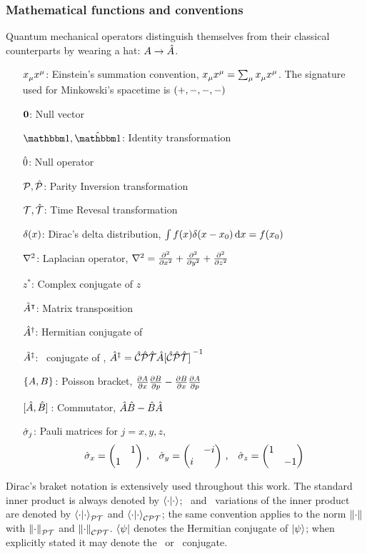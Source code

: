 \subsubsection{Mathematical functions and conventions}
Quantum mechanical operators distinguish themselves from their classical counterparts by wearing a hat: $A \to \hat{A}$.
\begin{enumerate}
    \item[$\tensor{x}{_\mu}\tensor{x}{^\mu}$:] Einstein's summation convention, $\tensor{x}{_\mu}\tensor{x}{^\mu} = \sum\nolimits_\mu \tensor{x}{_\mu}\tensor{x}{^\mu}$. The signature used for Minkowski's spacetime is $\pqty{+,-, -, -}$
    \item[$\vb{0}$:] Null vector
    \item[$\idM,\hidM$:] Identity transformation
    \item[$\hat{0}$:] Null operator 
    \item[$\mathcal{P},\mathcal{\hat{P}}$:] Parity Inversion transformation   
    \item[$\mathcal{T},\mathcal{\hat{T}}$:] Time Revesal transformation
    \item[$\delta\pqty{x}$:] Dirac's delta distribution, $\int{f\pqty{x}\delta\pqty{x-x_0}\dd{x}} = f\pqty{x_0}$
    \item[$\laplacian$:] Laplacian operator, $\laplacian = \pdv[2]{x} + \pdv[2]{y} + \pdv[2]{z}$ 
    \item[$z^*$:] Complex conjugate of $z$
    \item[$\hat{A}^\intercal$:] Matrix transposition
    \item[$\hat{A}^\dag$:] Hermitian conjugate of \hA
    \item[$\hat{A}^\ddag$:] \CPT\ conjugate of \hA, $\hA^\ddag = \CPTtransform{\hA}$
    \item[$\acomm*{A}{B}$:] Poisson bracket, $\pdv{A}{x}\pdv{B}{p} - \pdv{B}{x}\pdv{A}{p}$
    \item[$\comm*{\hA}{\hB}$:] Commutator, $\hat{A}\hat{B} - \hat{B}\hat{A}$  
    \item[$\hat{\sigma}_j$:] Pauli matrices for $j=x,y,z$,
        \begin{equation*}
            \togglehat{\sigma}_x = \pmqty{\admat{1,1}}
            \mycomma \quad
            \togglehat{\sigma}_y = \pmqty{\admat{-i,i}}
            \mycomma \quad
            \togglehat{\sigma}_z = \pmqty{\dmat{1,-1}}
        \end{equation*} 
\end{enumerate}
Dirac's braket notation is extensively used throughout this work. The standard inner product is always denoted by $\bra{\cdot}\ket{\cdot}$; \PT\ and \CPT\ variations of the inner product are denoted by $\braket{\cdot}{\cdot}_{\mathcal{P}\mathcal{T}}$ and $\braket{\cdot}{\cdot}_{\mathcal{C}\mathcal{P}\mathcal{T}}$; the same convention applies to the norm $\norm{\cdot}$ with $\norm{\cdot}_{\mathcal{P}\mathcal{T}}$ and $\norm{\cdot}_{\mathcal{C}\mathcal{P}\mathcal{T}}$. $\bra{\psi}$ denotes the Hermitian conjugate of $\ket{\psi}$; when explicitly stated it may denote the \PT\ or \CPT\ conjugate.